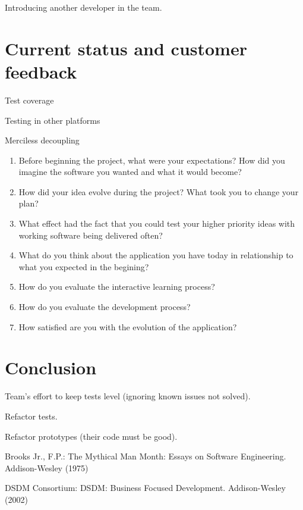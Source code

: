 \documentclass[lnbip]{svmultln}
\begin{document}
Introducing another developer in the team.

\section{Current status and customer feedback}
\label{sec:nowadays}

Test coverage

Testing in other platforms

Merciless decoupling

\begin{enumerate}
\item Before beginning the project, what were your expectations? How did you imagine the software you wanted and what it would become?
\item How did your idea evolve during the project? What took you to change your plan?
\item What effect had the fact that you could test your higher priority ideas with working software being delivered often?
\item What do you think about the application you have today in relationship to what you expected in the begining?
\item How do you evaluate the interactive learning process?
\item How do you evaluate the development process?
\item How satisfied are you with the evolution of the application?
\end{enumerate}

\section{Conclusion}
\label{sec:conclusion}

Team's effort to keep tests level (ignoring known issues not solved).

Refactor tests.

Refactor prototypes (their code must be good).

%
%
\begin{thebibliography}{5}

 Brooks Jr., F.P.: The Mythical Man Month: Essays
  on Software Engineering. Addison-Wesley (1975)

 DSDM Consortium: DSDM: Business Focused Development. Addison-Wesley (2002)




\end{thebibliography}
%
\end{document}
